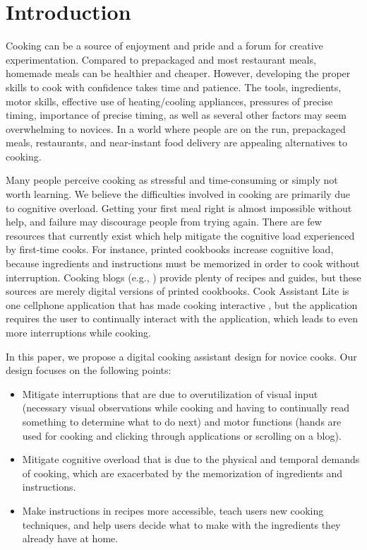 \documentclass{sigchi}
\begin{document}

\section{Introduction}
Cooking can be a source of enjoyment and pride and a forum for creative experimentation. Compared to prepackaged and most restaurant meals, homemade meals can be healthier and cheaper. However, developing the proper skills to cook with confidence takes time and patience. The tools, ingredients, motor skills, effective use of heating/cooling appliances, pressures of precise timing, importance of precise timing, as well as several other factors may seem overwhelming to novices. In a world where people are on the run, prepackaged meals, restaurants, and near-instant food delivery are appealing alternatives to cooking.

Many people perceive cooking as stressful and time-consuming or simply not worth learning. We believe the difficulties involved in cooking are primarily due to cognitive overload. Getting your first meal right is almost impossible without help, and failure may discourage people from trying again. There are few resources that currently exist which help mitigate the cognitive load experienced by first-time cooks. For instance, printed cookbooks increase cognitive load, because ingredients and instructions must be memorized in order to cook without interruption. Cooking blogs (e.g., \cite{cooking_classy, allrecipes}) provide plenty of recipes and guides, but these sources are merely digital versions of printed cookbooks. Cook Assistant Lite is one cellphone application that has made cooking interactive \cite{cook_lite}, but the application requires the user to continually interact with the application, which leads to even more interruptions while cooking.

In this paper, we propose a digital cooking assistant design for novice cooks. Our design focuses on the following points:
\begin{itemize}
\item	Mitigate interruptions that are due to overutilization of visual input (necessary visual observations while cooking and having to continually read something to determine what to do next) and motor functions (hands are used for cooking and clicking through applications or scrolling on a blog).
\item Mitigate cognitive overload that is due to the physical and temporal demands of cooking, which are exacerbated by the memorization of ingredients and instructions.
\item Make instructions in recipes more accessible, teach users new cooking techniques, and help users decide what to make with the ingredients they already have at home.
\end{itemize}
\end{document}
